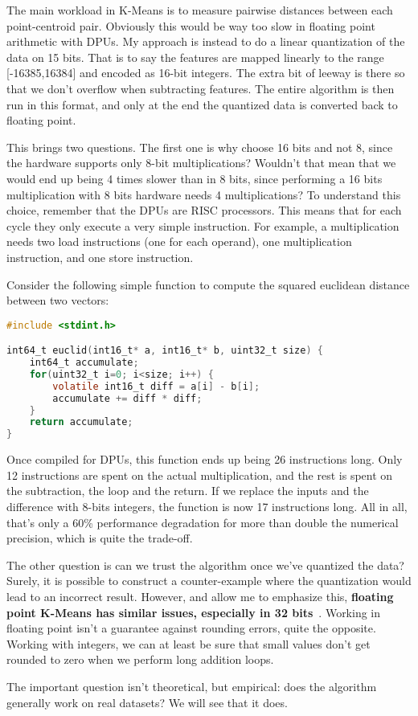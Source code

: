 The main workload in K-Means is to measure pairwise distances between each point-centroid pair. Obviously this would be way too slow in floating point arithmetic with DPUs. My approach is instead to do a linear quantization of the data on 15 bits. That is to say the features are mapped linearly to the range [-16385,16384] and encoded as 16-bit integers. The extra bit of leeway is there so that we don't overflow when subtracting features. The entire algorithm is then run in this format, and only at the end the quantized data is converted back to floating point.

This brings two questions. The first one is why choose 16 bits and not 8, since the hardware supports only 8-bit multiplications? Wouldn't that mean that we would end up being 4 times slower than in 8 bits, since performing a 16 bits multiplication with 8 bits hardware needs 4 multiplications? To understand this choice, remember that the DPUs are RISC processors. This means that for each cycle they only execute a very simple instruction. For example, a multiplication needs two load instructions (one for each operand), one multiplication instruction, and one store instruction.

Consider the following simple function to compute the squared euclidean distance between two vectors:
\begin{lstlisting}[language=C]
#include <stdint.h>

int64_t euclid(int16_t* a, int16_t* b, uint32_t size) {
    int64_t accumulate;
    for(uint32_t i=0; i<size; i++) {
        volatile int16_t diff = a[i] - b[i];
        accumulate += diff * diff;
    }
    return accumulate;
}    
\end{lstlisting}

Once compiled for DPUs, this function ends up being 26 instructions long. Only 12 instructions are spent on the actual multiplication, and the rest is spent on the subtraction, the loop and the return. If we replace the inputs and the difference with 8-bits integers, the function is now 17 instructions long. All in all, that's only a 60\% performance degradation for more than double the numerical precision, which is quite the trade-off.

The other question is can we trust the algorithm once we've quantized the data? Surely, it is possible to construct a counter-example where the quantization would lead to an incorrect result. However, and allow me to emphasize this, \textbf{floating point K-Means has similar issues, especially in 32 bits}~\cite{jezequel:hal-02486753}. Working in floating point isn't a guarantee against rounding errors, quite the opposite. Working with integers, we can at least be sure that small values don't get rounded to zero when we perform long addition loops.

The important question isn't theoretical, but empirical: does the algorithm generally work on real datasets? We will see that it does.